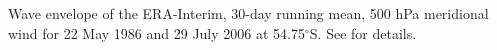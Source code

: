 \label{fig:example_figure}
Wave envelope of the ERA-Interim, 30-day running mean, 500 hPa meridional wind for 22 May 1986 and 29 July 2006 at 54.75$^{\circ}$S. See \citet{Irving2016} for details. 
  
  